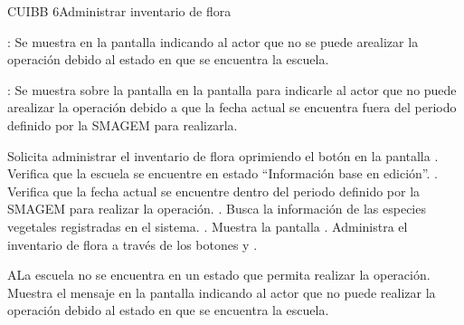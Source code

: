 \begin{UseCase}{CUIBB 6}{Administrar inventario de flora}
{\begin{UClist}
	    \UCli {}: Se muestra en la pantalla  indicando al actor que no se puede arealizar la operación debido al estado en que se encuentra la escuela.
	    
	    \UCli {}: Se muestra sobre la pantalla en la pantalla  para indicarle al actor que no puede arealizar la operación debido a que la fecha actual se encuentra fuera del periodo definido por la SMAGEM para realizarla.
	\end{UClist}
    }


\end{UseCase}

 \begin{UCtrayectoria}
    \UCpaso[\UCactor] Solicita administrar el inventario de flora oprimiendo el botón \botReg en la pantalla .
    \UCpaso[\UCsist] Verifica que la escuela se encuentre en estado ``Información base en edición''. .
    \UCpaso[\UCsist] Verifica que la fecha actual se encuentre dentro del periodo definido por la SMAGEM para realizar la operación. .
    \UCpaso[\UCsist] Busca la información de las especies vegetales registradas en el sistema. .
    \UCpaso[\UCsist] Muestra la pantalla .
    \UCpaso[\UCactor] Administra el inventario de flora a través de los botones y \botKo  . \label{cuibb6:Registrar}
 \end{UCtrayectoria}
 
 \begin{UCtrayectoriaA}{A}{La escuela no se encuentra en un estado que permita realizar la operación.}
    \UCpaso[\UCsist] Muestra el mensaje  en la pantalla  indicando al actor que no puede realizar la operación debido al estado en que se encuentra la escuela.
 \end{UCtrayectoriaA}
 

